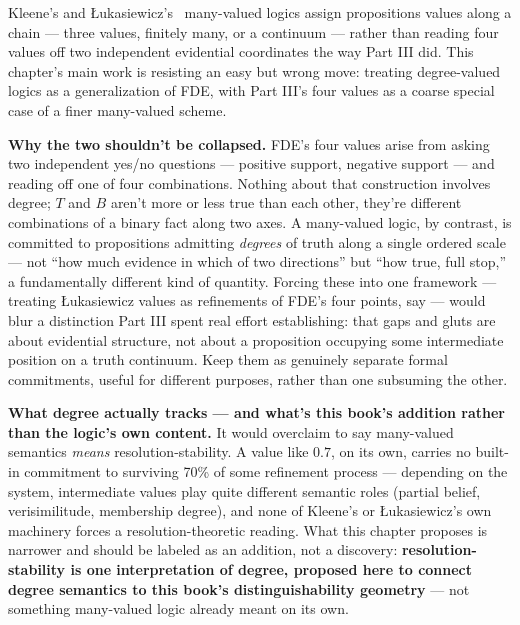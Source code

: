 Kleene's and Łukasiewicz's~\cite{lukasiewicz1920} many-valued logics assign propositions values
along a chain --- three values, finitely many, or a continuum --- rather than
reading four values off two independent evidential coordinates the way
Part III did. This chapter's main work is resisting an easy but wrong
move: treating degree-valued logics as a generalization of FDE, with
Part III's four values as a coarse special case of a finer many-valued
scheme.

\textbf{Why the two shouldn't be collapsed.} FDE's four values arise from
asking two independent yes/no questions --- positive support, negative
support --- and reading off one of four combinations. Nothing about that
construction involves degree; \(T\) and \(B\) aren't more or less true than
each other, they're different combinations of a binary fact along two
axes. A many-valued logic, by contrast, is committed to propositions
admitting \emph{degrees} of truth along a single ordered scale --- not ``how much
evidence in which of two directions'' but ``how true, full stop,'' a
fundamentally different kind of quantity. Forcing these into one
framework --- treating Łukasiewicz values as refinements of FDE's four
points, say --- would blur a distinction Part III spent real effort
establishing: that gaps and gluts are about evidential structure, not
about a proposition occupying some intermediate position on a truth
continuum. Keep them as genuinely separate formal commitments, useful for
different purposes, rather than one subsuming the other.

\textbf{What degree actually tracks --- and what's this book's addition rather
than the logic's own content.} It would overclaim to say many-valued
semantics \emph{means} resolution-stability. A value like \(0.7\), on its own,
carries no built-in commitment to surviving 70\% of some refinement
process --- depending on the system, intermediate values play quite
different semantic roles (partial belief, verisimilitude, membership
degree), and none of Kleene's or Łukasiewicz's own machinery forces a
resolution-theoretic reading. What this chapter proposes is narrower and
should be labeled as an addition, not a discovery: \textbf{resolution-stability
is one interpretation of degree, proposed here to connect degree
semantics to this book's distinguishability geometry} --- not something
many-valued logic already meant on its own.

